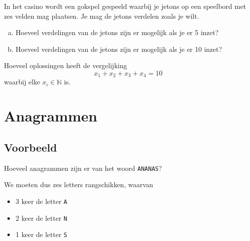 \documentclass[12pt,a4paper,twoside]{article}
\begin{document}
\begin{oefening}
In het casino wordt een gokspel gespeeld waarbij je jetons op een speelbord met zes velden mag plaatsen. Je mag de jetons verdelen zoals je wilt.
\begin{enumerate}[(a)]
  \item Hoeveel verdelingen van de jetons zijn er mogelijk als je er 5 inzet?
  \item Hoeveel verdelingen van de jetons zijn er mogelijk als je er 10 inzet?
\end{enumerate}
\end{oefening}

\begin{oefening} %
Hoeveel oplossingen heeft de vergelijking
$$x_1 + x_2 + x_3 + x_4 = 10$$
waarbij elke $x_i\in\mathbb{N}$ is.
\end{oefening}

\pagebreak
\section{Anagrammen}



\subsection{Voorbeeld}

Hoeveel anagrammen zijn er van het woord \verb#ANANAS#?

We moeten dus zes letters rangschikken, waarvan
\begin{itemize}
  \item 3 keer de letter \verb#A#
  \item 2 keer de letter \verb#N#
  \item 1 keer de letter \verb#S#
\end{itemize}
\end{document}
